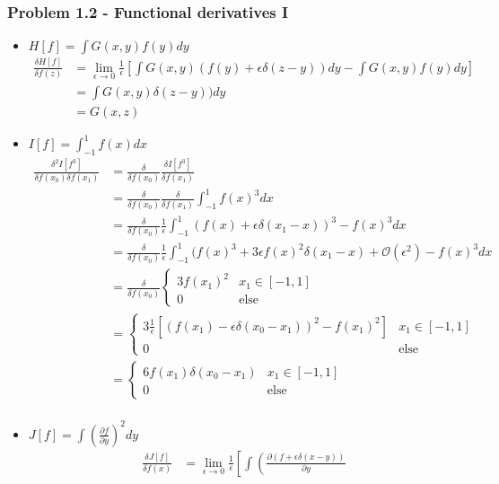 \documentclass[10pt,a4paper]{book}
\theoremstyle{definition}
\begin{document}
\subsubsection{Problem 1.2 - Functional derivatives I}
\begin{itemize}
\item $H[f]=\int G(x,y)f(y)dy$ 
\begin{align}
\frac{\delta H[f]}{\delta f(z)}
&=\lim_{\epsilon\rightarrow0}\frac{1}{\epsilon}\left[\int G(x,y)(f(y)+\epsilon\delta(z-y))dy-\int G(x,y)f(y)dy\right]\\
&=\int G(x,y)\delta(z-y))dy\\
&=G(x,z)
\end{align}
\item $I[f]=\int_{-1}^1f(x)dx$
\begin{align}
\frac{\delta^2I[f^3]}{\delta f(x_0)\delta f(x_1)}
&=\frac{\delta}{\delta f(x_0)}\frac{\delta I[f^3]}{\delta f(x_1)}\\
&=\frac{\delta}{\delta f(x_0)}\frac{\delta}{\delta f(x_1)}\int_{-1}^1f(x)^3dx\\
&=\frac{\delta}{\delta f(x_0)}\frac{1}{\epsilon}\int_{-1}^1(f(x)+\epsilon\delta(x_1-x))^3-f(x)^3dx\\
&=\frac{\delta}{\delta f(x_0)}\frac{1}{\epsilon}\int_{-1}^1(f(x)^3+3\epsilon f(x)^2\delta(x_1-x)+\mathcal{O}(\epsilon^2)-f(x)^3dx\\
&=\frac{\delta}{\delta f(x_0)}
\left\{
\begin{matrix}
 3f(x_1)^2 & x_1\in[-1,1]\\
 0         & \text{else}
\end{matrix}
\right.\\
&=
\left\{
\begin{matrix}
 3\frac{1}{\epsilon}[(f(x_1)-\epsilon\delta(x_0-x_1))^2-f(x_1)^2] & x_1\in[-1,1]\\
 0         & \text{else}
\end{matrix}
\right.\\
&=
\left\{
\begin{matrix}
 6f(x_1)\delta(x_0-x_1) & x_1\in[-1,1]\\
 0         & \text{else}
\end{matrix}
\right.\\
\end{align}
\item $J[f]=\int\left(\frac{\partial f}{\partial y}
\right)^2dy$
\begin{align}
\frac{\delta J[f]}{\delta f(x)}
&=\lim_{\epsilon\rightarrow0}\frac{1}{\epsilon}\left[\int\left(\frac{\partial (f+\epsilon\delta(x-y))}{\partial y}

\end{align}
\end{itemize}
\end{document}
